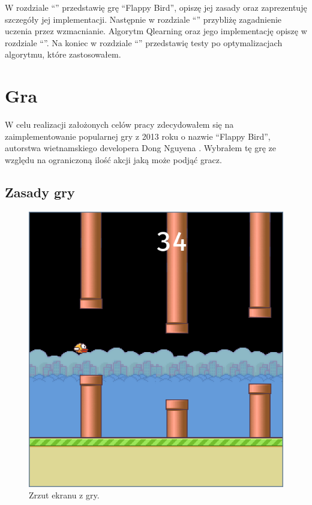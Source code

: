 \documentclass[a4paper, 12pt,oneside]{book}
\begin{document}
W rozdziale ``'' przedstawię grę ``Flappy Bird'',
opiszę jej
zasady oraz zaprezentuję szczegóły jej implementacji. Następnie w rozdziale
``'' przybliżę zagadnienie uczenia przez
wzmacnianie. Algorytm Q\dywiz learning oraz jego implementację opiszę w
rozdziale ``''. Na koniec w rozdziale
``'' przedstawię testy po optymalizacjach algorytmu,
które zastosowałem.
\newpage{}

\chapter{Gra}
\label{chapter:gra}
W celu realizacji założonych celów pracy zdecydowałem się na zaimplementowanie
popularnej gry z 2013 roku o nazwie ``Flappy Bird'',  autorstwa wietnamskiego
developera Dong Nguyena \cite{flappy_bird_author}. Wybrałem tę grę ze względu na
ograniczoną ilość akcji jaką może podjąć gracz.
\section{Zasady gry} 
\begin{figure}[h] 
	\begin{center}
		\includegraphics[scale=0.40]{flappy_bird.png}
		\caption{Zrzut ekranu z gry.}
		\label{flappy_screenshot}
	\end{center}
\end{figure}
\end{document}
